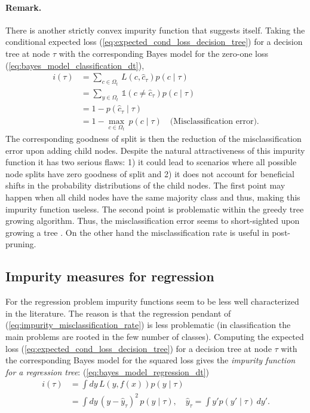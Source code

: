 \documentclass[12pt,a4paper]{article}
\begin{document}
\paragraph{Remark.}There is another strictly convex impurity function that suggests itself. Taking the conditional expected loss (\ref{eq:expected_cond_loss_decision_tree}) for a decision tree at node $\tau$ with the corresponding Bayes model for the zero-one loss (\ref{eq:bayes_model_classification_dt}), 
\begin{align} \label{eq:impurity_misclassification_rate}
	i(\tau) &= \sum_{c\in \Omega_t} \,L(c, \hat c_\tau) p(c \mid \tau)  \nonumber \\ 
	 &=\sum_{y\in \Omega_t} \, \mathbb 1 (c \neq \hat c_\tau) p(c \mid \tau)  \nonumber \\
	 &= 1 - p(\hat c_\tau \mid \tau)  \nonumber \\ 
	&= 1 - \underset{c\in \Omega_t}{\operatorname{max}} ~ p(c \mid\tau) \quad \text{(Misclassification error)}.
\end{align}    
The corresponding goodness of split is then the reduction of the misclassification  error upon adding child nodes. 
Despite the natural attractiveness of this impurity function it has two serious flaws: 1) it could lead to scenarios where all possible node splits have zero goodness of split and 2) it does not account for beneficial shifts in the probability distributions of the child nodes. 
The first point may happen when all child nodes have the same majority class \cite{cart84, understanding_random_forests} and thus, making this impurity function useless. The second point is problematic within the greedy tree growing algorithm. Thus, the misclassification error seems to short-sighted upon growing a tree \cite{cart84, hasties}.  On the other hand the misclassification rate is useful in post-pruning.

\subsection{Impurity measures for regression}
For the regression problem  impurity functions seem to be less well characterized in the literature. The reason is that the regression pendant of (\ref{eq:impurity_misclassification_rate})  is less problematic (in classification the main problems are rooted in the few number of classes). Computing the expected loss (\ref{eq:expected_cond_loss_decision_tree}) for a decision tree at node $\tau$ with the corresponding Bayes model for the squared loss gives the \textit{impurity function for a regression tree}:
(\ref{eq:bayes_model_regression_dt})
\begin{align} 
	i(\tau) & = \int dy\,L(y, f(x)) p(y \mid \tau) \nonumber \\
	 & =  \int dy\,(y -  \hat y_\tau)^2 \, p(y \mid \tau), \quad \hat y_\tau=\int  y' p(y' \mid \tau)\, dy'. \label{eq:impurity_measure_regression}
\end{align}
\end{document}
